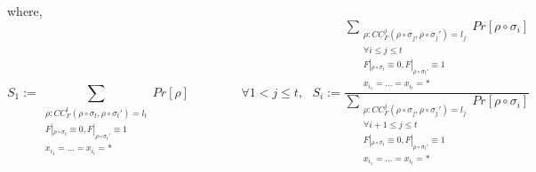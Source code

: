 where, 
$$
S_1 := \underset{\substack{\rho: CC_F^{t}(\rho\circ \sigma_t, \rho \circ \sigma_t')= l_t\\ F|_{\rho\circ \sigma_t} \equiv 0, F|_{\rho\circ \sigma_t'}\equiv 1\\x_{i_1}= \dots =x_{i_t} = *}} {\sum}Pr[\rho]
\hspace{50pt}  \forall 1< j \leq t,\ \ \ 
S_i := 
\frac{
\underset{\substack{\rho: CC_F^{j}(\rho\circ \sigma_j, \rho \circ \sigma_j')= l_j\\ \forall i\leq j \leq t\\ F|_{\rho\circ \sigma_t} \equiv 0, F|_{\rho\circ \sigma_t'}\equiv 1\\x_{i_1}=\ldots= x_{i_t} = *}} {\sum} Pr[\rho \circ \sigma_{i}]
}
{
\underset{\substack{\rho: CC_F^{j}(\rho\circ \sigma_j, \rho \circ \sigma_j')= l_j\\ \forall i+1\leq j \leq t\\F|_{\rho\circ \sigma_t} \equiv 0, F|_{\rho\circ \sigma_t'}\equiv 1\\x_{i_{1}}=\ldots= x_{i_t} = *}} {\sum} Pr[\rho\circ \sigma_{i} ]
}
$$

